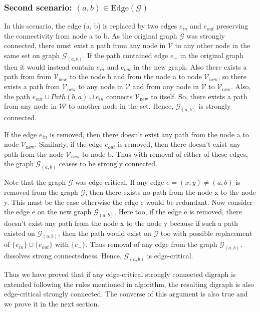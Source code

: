 \documentclass[runningheads]{llncs}
\begin{document}
\subsubsection{Second scenario: $(a, b) \in \text{Edge}(\mathcal{G})$} In this scenario, the edge (a, b) is replaced by two edges $e_{in}$ and $e_{out}$ preserving the connectivity from node a to b. As the original graph $\mathcal{G}$ was strongly connected, there must exist a path from any node in $\mathcal{V}$ to any other node in the same set on graph $\mathcal{G}_{(a, b)}$. If the path contained edge $e_{-}$ in the original graph then it would instead contain $e_{in}$ and $e_{out}$ in the new graph. Also there exists a path from from $\mathcal{V}_{\text{new}}$ to the node b and from the node a to node $\mathcal{V}_{\text{new}}$, so there exists a path from $\mathcal{V}_{\text{new}}$ to any node in $\mathcal{V}$ and from any node in $\mathcal{V}$ to $\mathcal{V}_{\text{new}}$. Also, the path $e_{out} \cup Path(b, a) \cup e_{in}$ connects $\mathcal{V}_{\text{new}}$ to itself. So, there exists a path from any node in $\mathcal{W}$ to another node in the set. Hence, $\mathcal{G}_{(a, b)}$ is strongly connected.

If the edge $e_{in}$ is removed, then there doesn't exist any path from the node a to node $\mathcal{V}_{\text{new}}$. Similarly, if the edge $e_{out}$ is removed, then there doesn't exist any path from the node $\mathcal{V}_{\text{new}}$ to node b. Thus with removal of either of these edges, the graph $\mathcal{G}_{(a, b)}$ ceases to be strongly connected. 

Note that the graph $\mathcal{G}$ was edge-critical. If any edge $e = (x, y) \neq (a, b)$ is removed from the graph $\mathcal{G}$, then there exists no path from the node x to the node y. This must be the case otherwise the edge e would be redundant. Now consider the edge e on the new graph $\mathcal{G}_{(a, b)}$. Here too, if the edge e is removed, there doesn't exist any path from the node x to the node y because if such a path existed on $\mathcal{G}_{(a, b)}$, then the path would exist on $\mathcal{G}$ too with possible replacement of $\{e_{in}\} \cup \{e_{out}\}$ with $\{e_{-}\}$. Thus removal of any edge from the graph $\mathcal{G}_{(a, b)}$, dissolves strong connectedness. Hence, $\mathcal{G}_{(a, b)}$ is edge-critical.

Thus we have proved that if any edge-critical strongly connected digraph is extended following the rules mentioned in algorithm, the resulting digraph is also edge-critical strongly connected. The converse of this argument is also true and we prove it in the next section.
\end{document}
